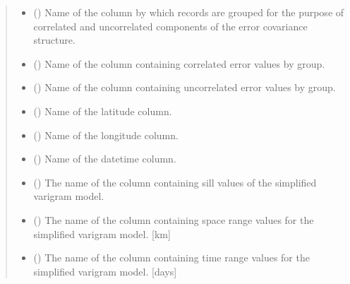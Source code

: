 \documentclass[letterpaper,10pt,english]{sphinxmanual}
\begin{document}
\begin{fulllineitems}
\begin{quote}
\begin{description}
\begin{itemize}
\item {}
\sphinxAtStartPar
{} () \textendash{} Name of the column by which records are grouped for the purpose of
correlated and uncorrelated components of the error covariance
structure.

\item {}
\sphinxAtStartPar
{} () \textendash{} Name of the column containing correlated error values by group.

\item {}
\sphinxAtStartPar
{} () \textendash{} Name of the column containing uncorrelated error values by group.

\item {}
\sphinxAtStartPar
{} () \textendash{} Name of the latitude column.

\item {}
\sphinxAtStartPar
{} () \textendash{} Name of the longitude column.

\item {}
\sphinxAtStartPar
{} () \textendash{} Name of the datetime column.

\item {}
\sphinxAtStartPar
{} () \textendash{} The name of the column containing sill values of the simplified varigram
model.

\item {}
\sphinxAtStartPar
{} () \textendash{} The name of the column containing space range values for the simplified
varigram model. {[}km{]}

\item {}
\sphinxAtStartPar
{} () \textendash{} The name of the column containing time range values for the simplified
varigram model. {[}days{]}


\end{itemize}
\end{description}
\end{quote}
\end{fulllineitems}
\end{document}
